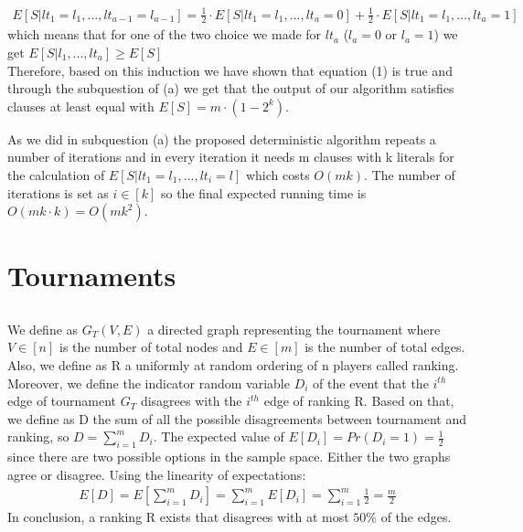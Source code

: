 \documentclass[11pt]{537homework}
\begin{document}
\begin{align*}
 E[S | lt_1 = l_1,...,lt_{a-1} = l_{a-1}] = \frac{1}{2} \cdot E[S | lt_1 = l_1,...,lt_{a} = 0] + \frac{1}{2} \cdot E[S | lt_1 = l_1,...,lt_{a} = 1]    
\end{align*}
which means that for one of the two choice we made for $lt_a$ ($l_a =0$ or $l_a=1$) we get $E[S | l_1,...,lt_{a}] \geq E[S]$\\
Therefore, based on this induction we have shown that equation (1) is true and through the subquestion of (a) we get that the output of our algorithm satisfies clauses at least equal with $E[S] = m \cdot (1 - 2^k)$.
\par As we did in subquestion (a) the proposed deterministic algorithm repeats a number of iterations and in every iteration it needs m clauses with k literals for the calculation of $E[S | lt_1 = l_1,...,lt_i = l]$ which costs $O(mk)$. The number of iterations is set as $i \in [k]$ so the final expected running time is $O(mk \cdot k) = O(mk^2)$.
\section{Tournaments}
\subsection{} 
We define as $G_{T}(V,E)$ a directed graph representing the tournament where $V \in [n]$ is the number of total nodes and $E \in [m]$ is the number of total edges. Also, we define as R a uniformly at random  ordering of n players called ranking.
Moreover, we define the indicator random variable $D_i$ of the event that the $i^{th}$ edge of tournament $G_T$ disagrees with the $i^{th}$ edge of ranking R. Based on that, we define as D the sum of all the possible disagreements between tournament and ranking, so $D = \sum_{i=1}^{m} D_i$. The expected value of $ E[D_i] = Pr(D_i = 1)= \frac{1}{2}$ since there are two possible options in the sample space. Either the two graphs agree or disagree. Using the linearity of expectations:
\begin{align*}
    E[D] = E[\sum_{i=1}^{m} D_i] = \sum_{i=1}^{m} E[D_i] = \sum_{i=1}^{m} \frac{1}{2} = \frac{m}{2}
\end{align*}
In conclusion, a ranking R exists that disagrees with at most $50\%$ of the edges.
\end{document}
